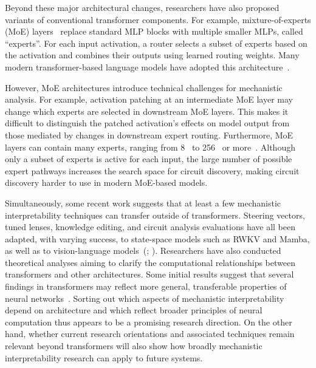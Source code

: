 Beyond these major architectural changes, researchers have also proposed variants of conventional transformer components. For example, mixture-of-experts (MoE) layers~ replace standard MLP blocks with multiple smaller MLPs, called ``experts''. For each input activation, a router selects a subset of experts based on the activation and combines their outputs using learned routing weights. Many modern transformer-based language models have adopted this architecture~.

However, MoE architectures introduce technical challenges for mechanistic analysis. For example, activation patching at an intermediate MoE layer may change which experts are selected in downstream MoE layers. This makes it difficult to distinguish the patched activation’s effects on model output from those mediated by changes in downstream expert routing. Furthermore, MoE layers can contain many experts, ranging from 8~ to 256~ or more~. Although only a subset of experts is active for each input, the large number of possible expert pathways increases the search space for circuit discovery, making circuit discovery harder to use in modern MoE-based models.

Simultaneously, some recent work suggests that at least a few mechanistic interpretability techniques can transfer outside of transformers. Steering vectors, tuned lenses, knowledge editing, and circuit analysis evaluations have all been adapted, with varying success, to state-space models such as RWKV and Mamba, as well as to vision-language models~(; ). Researchers have also conducted theoretical analyses aiming to clarify the computational relationships between transformers and other architectures. Some initial results suggest that several findings in transformers may reflect more general, transferable properties of neural networks~. Sorting out which aspects of mechanistic interpretability depend on architecture and which reflect broader principles of neural computation thus appears to be a promising research direction. On the other hand, whether current research orientations and associated techniques remain relevant beyond transformers will also show how broadly mechanistic interpretability research can apply to future systems.
